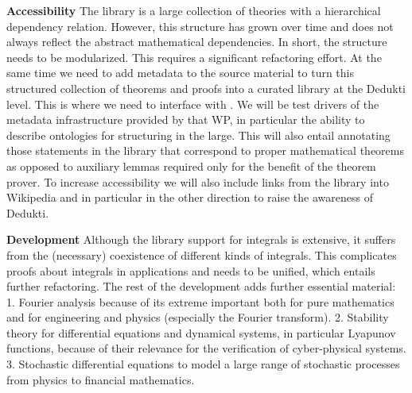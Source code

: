 \begin{workpackage}[id=libraries,wphases=0-48,type=RTD,
  short=Libraries,%
  title=Libraries,
  lead=Inr,
  InrRM=10,
  TumRM=24]
\begin{tasklist}
\begin{task}[id=isaAnalysisProb,title=The Isabelle Analysis \& Probability library]
\textbf{Accessibility}\quad
The library is a large collection of theories with a hierarchical dependency
relation. However, this structure has grown over time and does not always
reflect the abstract mathematical dependencies. In short, the structure needs
to be modularized. This requires a significant refactoring effort.
%
At the same time we need to add metadata to the source material to turn this
structured collection of theorems and proofs into a curated library at the
Dedukti level.  This is where we need to interface with . We
will be test drivers of the metadata infrastructure provided by that WP, in
particular the ability to describe ontologies for structuring in the large.
This will also entail annotating those statements in the library that
correspond to proper mathematical theorems as opposed to auxiliary lemmas
required only for the benefit of the theorem prover.
To increase accessibility we will also include links from the library into
Wikipedia and in particular in the other direction to raise the awareness
of Dedukti.

\textbf{Development}\quad
Although the library support for integrals is extensive, it suffers
from the (necessary) coexistence of different kinds of
integrals. This complicates proofs about integrals in applications and needs
to be unified, which entails further refactoring. The rest of the
development adds further essential material:
1. Fourier analysis because of its extreme important both for pure mathematics and for
engineering and physics (especially the Fourier
transform). 2. Stability theory for differential equations and
dynamical systems, in particular Lyapunov functions, because of their
relevance for the verification of cyber-physical systems.
3. Stochastic differential equations to model a large range of
stochastic processes from physics to financial mathematics.
\end{task}

\begin{task}[id=geocoq,title=The GeoCoq library]
\end{task}

\begin{task}[id=flyspeck,title=The Flyspeck library]
\end{task}

\begin{task}[id=cakeml,title=The CakeML programming language library]
\end{task}


\end{tasklist}
\end{workpackage}
